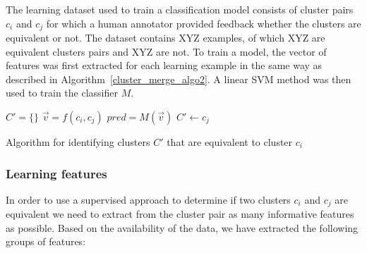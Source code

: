\documentclass[twoside,11pt]{article}
\begin{document}
The learning dataset used to train a classification model consists of cluster pairs $c_i$ and $c_j$ for which a human annotator provided feedback whether the clusters are equivalent or not. The dataset contains XYZ examples, of which XYZ are equivalent clusters pairs and XYZ are not. To train a model, the vector of features was first extracted for each learning example in the same way as described in Algorithm~\ref{cluster_merge_algo2}. A linear SVM method was then used to train the classifier $M$.

\begin{algorithm}[tb!]

$C' = \{\}$\;
 {
    $\vec{v} = f(c_i, c_j)$\;
    $pred = M(\vec{v})$\;
     {
        $C' \leftarrow c_j$
    }
}
\caption{Algorithm for identifying clusters $C'$ that are equivalent to cluster $c_i$}
\label{cluster_merge_algo2}
\end{algorithm}

\subsubsection{Learning features}

In order to use a supervised approach to determine if two clusters $c_i$ and $c_j$ are equivalent we need to extract from the cluster pair as many informative features as possible. Based on the availability of the data, we have extracted the following groups of features:
\end{document}
